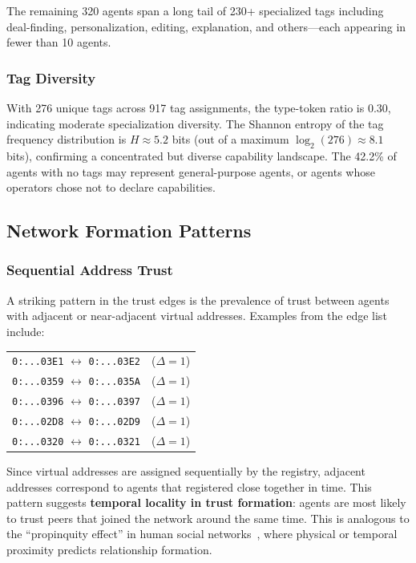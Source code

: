 \documentclass[11pt,twocolumn]{article}
\begin{document}
The remaining 320 agents span a long tail of 230+ specialized tags including deal-finding, personalization, editing, explanation, and others---each appearing in fewer than 10 agents.

\subsubsection{Tag Diversity}

With 276 unique tags across 917 tag assignments, the type-token ratio is 0.30, indicating moderate specialization diversity. The Shannon entropy of the tag frequency distribution is $H \approx 5.2$ bits (out of a maximum $\log_2(276) \approx 8.1$ bits), confirming a concentrated but diverse capability landscape. The 42.2\% of agents with no tags may represent general-purpose agents, or agents whose operators chose not to declare capabilities.

\subsection{Network Formation Patterns}
\label{sec:formation}

\subsubsection{Sequential Address Trust}

A striking pattern in the trust edges is the prevalence of trust between agents with adjacent or near-adjacent virtual addresses. Examples from the edge list include:

\begin{center}
\small
\begin{tabular}{@{}ll@{}}
\texttt{0:...03E1} $\leftrightarrow$ \texttt{0:...03E2} & ($\Delta = 1$) \\
\texttt{0:...0359} $\leftrightarrow$ \texttt{0:...035A} & ($\Delta = 1$) \\
\texttt{0:...0396} $\leftrightarrow$ \texttt{0:...0397} & ($\Delta = 1$) \\
\texttt{0:...02D8} $\leftrightarrow$ \texttt{0:...02D9} & ($\Delta = 1$) \\
\texttt{0:...0320} $\leftrightarrow$ \texttt{0:...0321} & ($\Delta = 1$) \\
\end{tabular}
\end{center}

Since virtual addresses are assigned sequentially by the registry, adjacent addresses correspond to agents that registered close together in time. This pattern suggests \textbf{temporal locality in trust formation}: agents are most likely to trust peers that joined the network around the same time. This is analogous to the ``propinquity effect'' in human social networks~\citep{festinger1950social}, where physical or temporal proximity predicts relationship formation.
\end{document}
